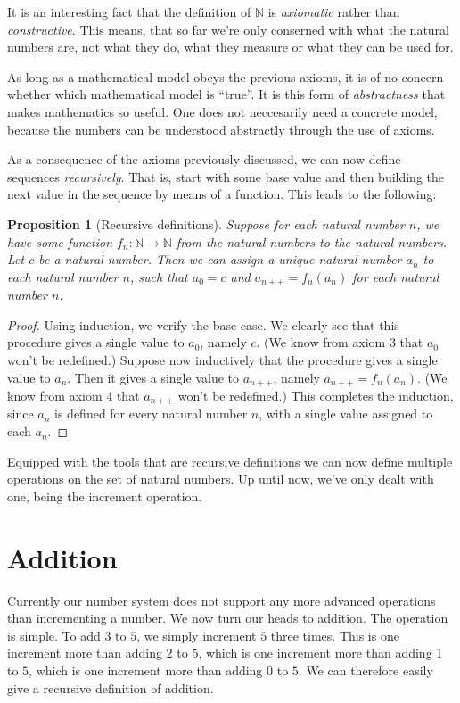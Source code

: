 \documentclass[a4paper, twocolumn]{report}
\newcounter{dummy} \numberwithin{dummy}{section}
\newtheorem{prp}[dummy]{Proposition}
\begin{document}
It is an interesting fact that the definition of $\mathbb{N}$ is
\textit{axiomatic} rather than \textit{constructive}. This means, that so far
we're only conserned with what the natural numbers are, not what they do, what
they measure or what they can be used for.

As long as a mathematical model obeys the previous axioms, it is of no concern
whether which mathematical model is ``true''. It is this form of
\textit{abstractness} that makes mathematics so useful. One does not
neccesarily need a concrete model, because the numbers can be understood
abstractly through the use of axioms.

As a consequence of the axioms previously discussed, we can now define
sequences \textit{recursively}.  That is, start with some base value and then
building the next value in the sequence by means of a function.  This leads to
the following:

\begin{prp}[Recursive definitions]
  Suppose for each natural number $n$, we have some function $f_n:\mathbb{N}
  \rightarrow \mathbb{N}$ from the natural numbers to the natural numbers. Let
  $c$ be a natural number.  Then we can assign a unique natural number $a_n$ to
  each natural number $n$, such that $a_0 = c$ and $a_{n++} = f_{n}\left( a_n
  \right)$ for each natural number $n$. 
\end{prp}
\begin{proof}
  Using induction, we verify the base case. We clearly see that this procedure
  gives a single value to $a_0$, namely $c$. (We know from axiom 3 that $a_0$
  won't be redefined.) Suppose now inductively that the procedure gives a
  single value to $a_n$. Then it gives a single value to $a_{n++}$, namely
  $a_{n++} = f_n\left( a_n \right)$. (We know from axiom 4 that $a_{n++}$ won't
  be redefined.) This completes the induction, since $a_n$ is defined for every
  natural number $n$, with a single value assigned to each $a_n$.
\end{proof}

Equipped with the tools that are recursive definitions we can now define
multiple operations on the set of natural numbers. Up until now, we've only
dealt with one, being the increment operation.

\section{Addition}

Currently our number system does not support any more advanced operations than
incrementing a number.  We now turn our heads to addition. The operation is
simple. To add $3$ to $5$, we simply increment $5$ three times. This is one
increment more than adding $2$ to $5$, which is one increment more than adding
$1$ to $5$, which is one increment more than adding $0$ to $5$. We can
therefore easily give a recursive definition of addition.
\end{document}
